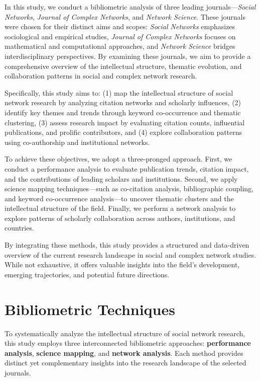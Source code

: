 \documentclass[twocolumn]{article}
\begin{document}
	In this study, we conduct a bibliometric analysis of three leading journals—\textit{Social Networks}, \textit{Journal of Complex Networks}, and \textit{Network Science}. These journals were chosen for their distinct aims and scopes: \textit{Social Networks} emphasizes sociological and empirical studies, \textit{Journal of Complex Networks} focuses on mathematical and computational approaches, and \textit{Network Science} bridges interdisciplinary perspectives. By examining these journals, we aim to provide a comprehensive overview of the intellectual structure, thematic evolution, and collaboration patterns in social and complex network research.
	
	Specifically, this study aims to: (1) map the intellectual structure of social network research by analyzing citation networks and scholarly influences, (2) identify key themes and trends through keyword co-occurrence and thematic clustering, (3) assess research impact by evaluating citation counts, influential publications, and prolific contributors, and (4) explore collaboration patterns using co-authorship and institutional networks.
	
	To achieve these objectives, we adopt a three-pronged approach. First, we conduct a performance analysis to evaluate publication trends, citation impact, and the contributions of leading scholars and institutions. Second, we apply science mapping techniques—such as co-citation analysis, bibliographic coupling, and keyword co-occurrence analysis—to uncover thematic clusters and the intellectual structure of the field. Finally, we perform a network analysis to explore patterns of scholarly collaboration across authors, institutions, and countries.
	
	By integrating these methods, this study provides a structured and data-driven overview of the current research landscape in social and complex network studies. While not exhaustive, it offers valuable insights into the field’s development, emerging trajectories, and potential future directions.
	
	\section{Bibliometric Techniques}\label{Bibliometric Techniques}
	
	To systematically analyze the intellectual structure of social network research, this study employs three interconnected bibliometric approaches: \textbf{performance analysis}, \textbf{science mapping}, and \textbf{network analysis}. Each method provides distinct yet complementary insights into the research landscape of the selected journals.
	
\end{document}
